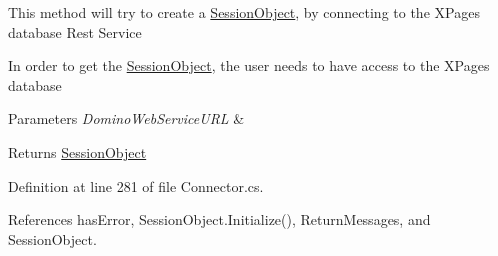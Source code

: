 This method will try to create a \mbox{\hyperlink{class_session_object}{Session\+Object}}, by connecting to the X\+Pages database Rest Service 

In order to get the \mbox{\hyperlink{class_session_object}{Session\+Object}}, the user needs to have access to the X\+Pages database


\begin{DoxyParams}{Parameters}
{\em Domino\+Web\+Service\+U\+RL} & \\
\hline
\end{DoxyParams}
\begin{DoxyReturn}{Returns}
\mbox{\hyperlink{class_session_object}{Session\+Object}}
\end{DoxyReturn}


Definition at line 281 of file Connector.\+cs.



References has\+Error, Session\+Object.\+Initialize(), Return\+Messages, and Session\+Object.


